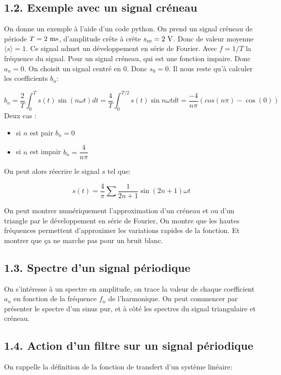 \documentclass[french, a4paper, 10pt, twocolumn, landscape]{article}
\begin{document}
\subsection*{1.2. Exemple avec un signal créneau}
On donne un exemple à l'aide d'un code python. On prend un signal créneau de période $T=2~\rm ms$, d'amplitude crête à crête $s_{cc}=2~\rm V$. Donc de valeur moyenne $\langle s\rangle = 1$. Ce signal admet un développement en série de Fourier. Avec $f=1/T$ la fréquence du signal. Pour un signal créneau, qui est une fonction impaire. Donc $a_n=0$. On choisit un signal centré en $0$. Donc $s_0 = 0$. Il nous reste qu'à calculer les coefficients $b_n$: 


$$b_n = \dfrac{2}{T}\int_{0}^Ts(t)\sin(n\omega t)dt = \dfrac{4}{T}\int_{0}^{T/2}s(t)\sin{n\omega t}dt = \dfrac{-4}{n\pi}(cos(n\pi)-\cos(0))$$
Deux cas : 
\begin{itemize}
  \item si $n$ est pair $b_n=0$
  \item si $n$ est impair $b_n = \dfrac{4}{n\pi}$
\end{itemize}
On peut alors réecrire le signal $s$ tel que:

\begin{equation}
  s(t) = \dfrac{4}{\pi}\sum \dfrac{1}{2n+1}\sin{(2n+1)\omega t}
\end{equation}

On peut montrer numériquement l'approximation d'un créneau et ou d'un triangle par le développement en série de Fourier, On montre que les hautes fréquences permettent d'approximer les variations rapides de la fonction.  Et montrer que ça ne marche pas pour un bruit blanc.

\subsection*{1.3. Spectre d'un signal périodique}

On s'intéresse à un spectre en amplitude, on trace la valeur de chaque coefficient $a_n$ en fonction de la fréquence $f_n$ de l'harmonique. On peut commencer par présenter le spectre d'un sinus pur, et à côté les spectres du signal triangulaire et créneau.

\subsection*{1.4. Action d'un filtre sur un signal périodique}

On rappelle la définition de la fonction de transfert d'un système linéaire: 
\end{document}
